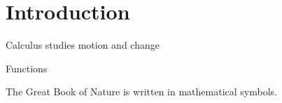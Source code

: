 \section{Introduction}
\begin{introduction}
  \item Calculus studies motion and change
  \item Functions
\end{introduction}
\begin{remark}
  The Great Book of Nature is written in mathematical symbols.
\end{remark}